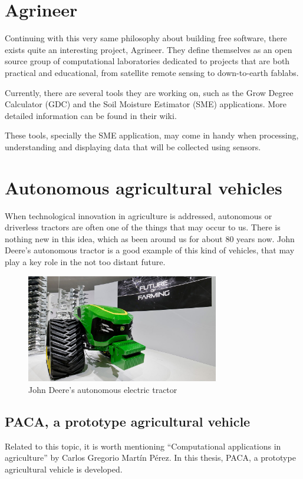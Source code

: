 \section{Agrineer}
Continuing with this very same philosophy about building free software, there exists quite an interesting project, Agrineer. They define themselves as an open source group of computational laboratories dedicated to projects that are both practical and educational, from satellite remote sensing to down-to-earth fablabs\cite{agrineer}.

Currently, there are several tools they are working on, such as the Grow Degree Calculator (GDC) and the Soil Moisture Estimator (SME) applications. More detailed information can be found in their wiki.

These tools, specially the SME application, may come in handy when processing, understanding and displaying data that will be collected using sensors.


\section{Autonomous agricultural vehicles}
When technological innovation in agriculture is addressed, autonomous or driverless tractors are often one of the things that may occur to us. There is nothing new in this idea, which as been around us for about 80 years now. John Deere's autonomous tractor\cite{deere-tractor} is a good example of this kind of vehicles, that may play a key role in the not too distant future.

\begin{figure}[htp]
    \centering
    \includegraphics[width=0.75\textwidth]{fig/deere-tractor.jpg}
    \caption{John Deere’s autonomous electric tractor}
    \label{fig:deere-tractor}
\end{figure}

\subsection{PACA, a prototype agricultural vehicle}
Related to this topic, it is worth mentioning ``Computational applications in agriculture'' \cite{paca} by Carlos Gregorio Martín Pérez. In this thesis, PACA, a prototype agricultural vehicle is developed.

